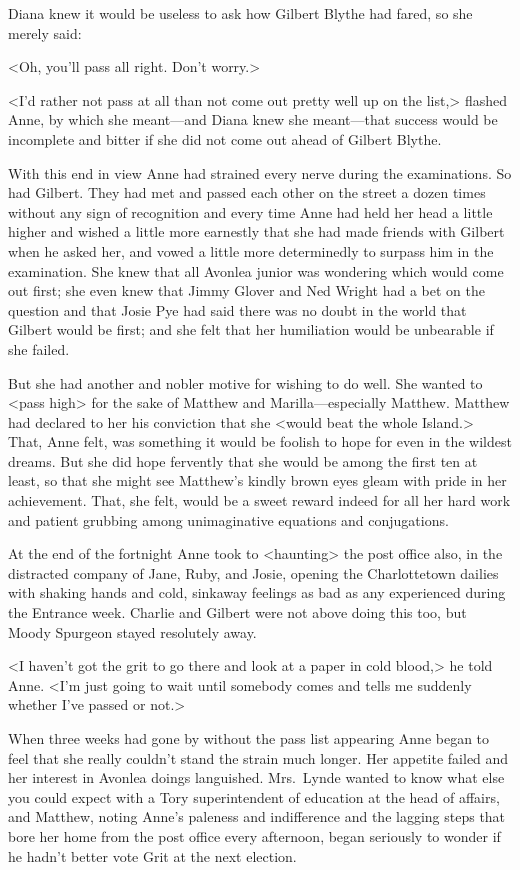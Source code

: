 Diana knew it would be useless to ask how Gilbert Blythe had fared, so she merely said:

<Oh, you'll pass all right. Don't worry.>

<I'd rather not pass at all than not come out pretty well up on the list,> flashed Anne, by which she meant—and Diana knew she meant—that success would be incomplete and bitter if she did not come out ahead of Gilbert Blythe.

With this end in view Anne had strained every nerve during the examinations. So had Gilbert. They had met and passed each other on the street a dozen times without any sign of recognition and every time Anne had held her head a little higher and wished a little more earnestly that she had made friends with Gilbert when he asked her, and vowed a little more determinedly to surpass him in the examination. She knew that all Avonlea junior was wondering which would come out first; she even knew that Jimmy Glover and Ned Wright had a bet on the question and that Josie Pye had said there was no doubt in the world that Gilbert would be first; and she felt that her humiliation would be unbearable if she failed.

But she had another and nobler motive for wishing to do well. She wanted to <pass high> for the sake of Matthew and Marilla—especially Matthew. Matthew had declared to her his conviction that she <would beat the whole Island.> That, Anne felt, was something it would be foolish to hope for even in the wildest dreams. But she did hope fervently that she would be among the first ten at least, so that she might see Matthew's kindly brown eyes gleam with pride in her achievement. That, she felt, would be a sweet reward indeed for all her hard work and patient grubbing among unimaginative equations and conjugations.

At the end of the fortnight Anne took to <haunting> the post office also, in the distracted company of Jane, Ruby, and Josie, opening the Charlottetown dailies with shaking hands and cold, sinkaway feelings as bad as any experienced during the Entrance week. Charlie and Gilbert were not above doing this too, but Moody Spurgeon stayed resolutely away.

<I haven't got the grit to go there and look at a paper in cold blood,> he told Anne. <I'm just going to wait until somebody comes and tells me suddenly whether I've passed or not.>

When three weeks had gone by without the pass list appearing Anne began to feel that she really couldn't stand the strain much longer. Her appetite failed and her interest in Avonlea doings languished. Mrs.~Lynde wanted to know what else you could expect with a Tory superintendent of education at the head of affairs, and Matthew, noting Anne's paleness and indifference and the lagging steps that bore her home from the post office every afternoon, began seriously to wonder if he hadn't better vote Grit at the next election.

